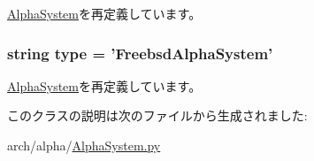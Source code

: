 \hyperlink{classAlphaSystem_1_1AlphaSystem_af401252d15d9cecde29d1fdcbaba250d}{AlphaSystem}を再定義しています。\hypertarget{classAlphaSystem_1_1FreebsdAlphaSystem_acce15679d830831b0bbe8ebc2a60b2ca}{
\subsubsection[{type}]{\setlength{\rightskip}{0pt plus 5cm}string type = '{\bf FreebsdAlphaSystem}'}}
\label{classAlphaSystem_1_1FreebsdAlphaSystem_acce15679d830831b0bbe8ebc2a60b2ca}


\hyperlink{classAlphaSystem_1_1AlphaSystem_acce15679d830831b0bbe8ebc2a60b2ca}{AlphaSystem}を再定義しています。

このクラスの説明は次のファイルから生成されました:\begin{DoxyCompactItemize}
\item 
arch/alpha/\hyperlink{AlphaSystem_8py}{AlphaSystem.py}\end{DoxyCompactItemize}
